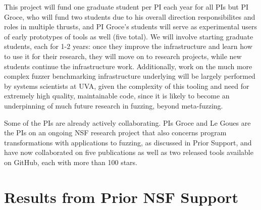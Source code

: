 This project will fund one graduate student per PI each year for all
PIs but PI Groce, who will fund two students due to his overall
direction responsibilites and roles in multiple thrusts, and PI
Groce's students will serve as experimental users of early prototypes
of tools as well
(five total).  We will
involve starting graduate students, each for 1-2 years: once they
improve the infrastructure and learn how to use it for their research,
they will move on to research projects, while new
students continue the infrastructure work.  Additionally, work on the much more 
complex fuzzer benchmarking infrastructure underlying will be largely performed 
by systems scientists at UVA, given the complexity of this tooling and need for 
extremely high quality, maintainable code, since it is likely to become an 
underpinning of much future research in fuzzing, beyond meta-fuzzing.


Some of the PIs are already actively collaborating.
PIs Groce and Le Goues are the PIs on an ongoing NSF research project
that also concerns program transformations with applications to
fuzzing, as discussed in Prior Support, and have now collaborated on
five publications as well as two released tools available on GitHub,
each with more than 100 stars.

\section{Results from Prior NSF Support}


